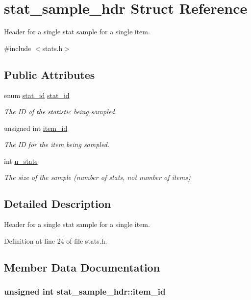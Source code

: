 \hypertarget{structstat__sample__hdr}{\section{stat\-\_\-sample\-\_\-hdr Struct Reference}
\label{structstat__sample__hdr}
}


Header for a single stat sample for a single item.  




{\ttfamily \#include $<$stats.\-h$>$}

\subsection*{Public Attributes}
\begin{DoxyCompactItemize}
\item 
enum \hyperlink{stat__ids_8h_ac210bd14ba53357098c0b3ebdd69784e}{stat\-\_\-id} \hyperlink{structstat__sample__hdr_a742c0f6bbca05f6e9274202df2e6d6a2}{stat\-\_\-id}
\begin{DoxyCompactList}\small\item\em The I\-D of the statistic being sampled. \end{DoxyCompactList}\item 
unsigned int \hyperlink{structstat__sample__hdr_a703445401038b7d18383320e19a0523c}{item\-\_\-id}
\begin{DoxyCompactList}\small\item\em The I\-D for the item being sampled. \end{DoxyCompactList}\item 
int \hyperlink{structstat__sample__hdr_a597d2260ddea06ef785ead436adb277c}{n\-\_\-stats}
\begin{DoxyCompactList}\small\item\em The size of the sample (number of stats, not number of items) \end{DoxyCompactList}\end{DoxyCompactItemize}


\subsection{Detailed Description}
Header for a single stat sample for a single item. 

Definition at line 24 of file stats.\-h.



\subsection{Member Data Documentation}
\hypertarget{structstat__sample__hdr_a703445401038b7d18383320e19a0523c}{
\subsubsection[{item\-\_\-id}]{\setlength{\rightskip}{0pt plus 5cm}unsigned int stat\-\_\-sample\-\_\-hdr\-::item\-\_\-id}}\label{structstat__sample__hdr_a703445401038b7d18383320e19a0523c}


